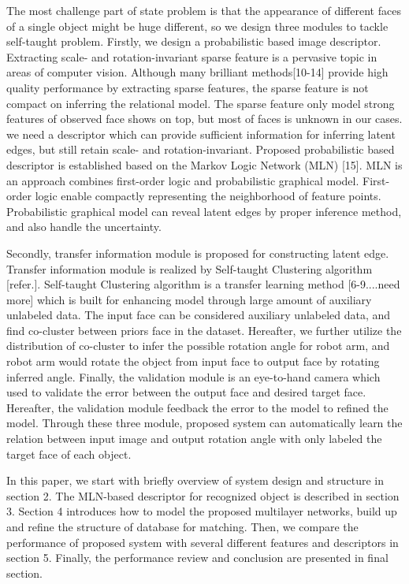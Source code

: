 \documentclass[journal]{IEEEtran}
\begin{document}
The most challenge part of state problem is that the appearance of different faces of a single object might be huge different, so we design three modules to tackle self-taught problem. Firstly, we design a probabilistic based image descriptor. Extracting scale- and rotation-invariant sparse feature is a pervasive topic in areas of computer vision. Although many brilliant methods[10-14] provide high quality performance by extracting sparse features, the sparse feature is not compact on inferring the relational model. The sparse feature only model strong features of observed face shows on top, but most of faces is unknown in our cases. we need a descriptor which can provide sufficient information for inferring latent edges, but still retain scale- and rotation-invariant. Proposed probabilistic based descriptor is established based on the Markov Logic Network (MLN) [15]. MLN is an approach combines first-order logic and probabilistic graphical model. First-order logic enable compactly representing the neighborhood of feature points. Probabilistic graphical model can reveal latent edges by proper inference method, and also handle the uncertainty. 

Secondly, transfer information module is proposed for constructing latent edge. Transfer information module is realized by Self-taught Clustering algorithm [refer.]. Self-taught Clustering algorithm is a transfer learning method [6-9....need more] which is built for enhancing model through large amount of auxiliary unlabeled data. The input face can be considered auxiliary unlabeled data, and find co-cluster between priors face in the dataset. Hereafter, we further utilize the distribution of co-cluster to infer the possible rotation angle for robot arm, and robot arm would rotate the object from input face to output face by rotating inferred angle. Finally, the validation module is an eye-to-hand camera which used to validate the error between the output face and desired target face. Hereafter, the validation module feedback the error to the model to refined the model. Through these three module, proposed system can automatically learn the relation between input image and output rotation angle with only labeled the target face of each object.

In this paper, we start with briefly overview of system design and structure in section 2. The MLN-based descriptor for recognized object is described in section 3. Section 4 introduces how to model the proposed multilayer networks, build up and refine the structure of database for matching. Then, we compare the performance of proposed system with several different features and descriptors in section 5. Finally, the performance review and conclusion are presented in final section.
\end{document}
